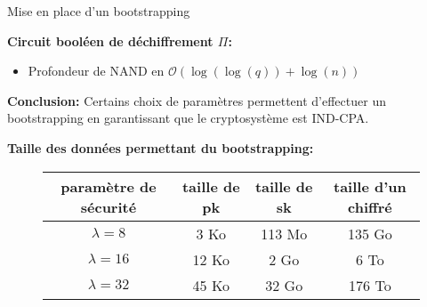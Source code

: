 \documentclass[10pt,xcolor={usenames,dvipsnames}]{beamer}
\begin{document}
\begin{section}{Mise en place d'un bootstrapping}
\begin{frame}
\textbf{Circuit booléen de déchiffrement $\Pi$:}
\begin{itemize}
\item Profondeur de NAND en $\mathcal{O}(\log(\log(q)) + \log(n))$
\end{itemize}

\textbf{Conclusion:}
Certains choix de paramètres permettent d'effectuer un bootstrapping en garantissant que le cryptosystème est IND-CPA.
\pause

\textbf{Taille des données permettant du bootstrapping:}
\begin{figure}
\begin{tabular}{|c|c|c|c|}
\hline
paramètre de sécurité & taille de pk & taille de sk & taille d'un chiffré \\
\hline
$\lambda = 8$ & 3 Ko & 113 Mo & 135 Go \\
\hline
$\lambda = 16$ & 12 Ko & 2 Go & 6 To \\
\hline
$\lambda = 32$ & 45 Ko & 32 Go & 176 To \\
\hline
\end{tabular}
\end{figure}
\end{frame}

\end{section}
\end{document}
